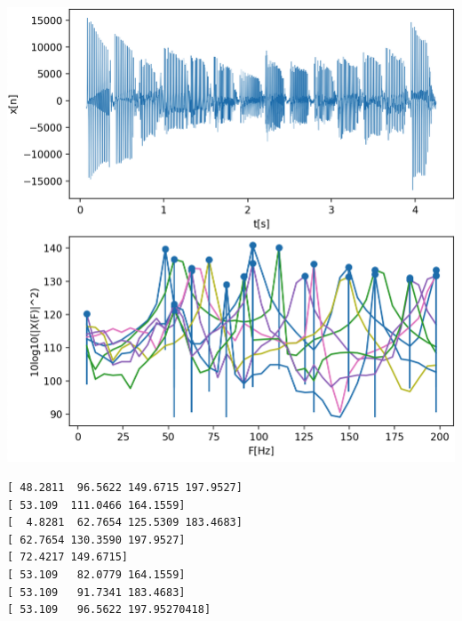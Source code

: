 \begin{listing}[ht]
    \noindent
    \begin{minipage}{0.51\textwidth}
        \strut\vspace*{-\baselineskip}\newline
        \inputminted[firstline=10, lastline=44]{python3}{code/stft_1.py}
    \end{minipage}%
    \begin{minipage}{0.48\textwidth}
        \strut\vspace*{-\baselineskip}\newline
        \includegraphics[width=\textwidth]{code/stft_1.png}

\begin{verbatim}
[ 48.2811  96.5622 149.6715 197.9527]
[ 53.109  111.0466 164.1559]
[  4.8281  62.7654 125.5309 183.4683]
[ 62.7654 130.3590 197.9527]
[ 72.4217 149.6715]
[ 53.109   82.0779 164.1559]
[ 53.109   91.7341 183.4683]
[ 53.109   96.5622 197.95270418]
\end{verbatim}
    \end{minipage}
    \label{py:stft_1}
\end{listing}


